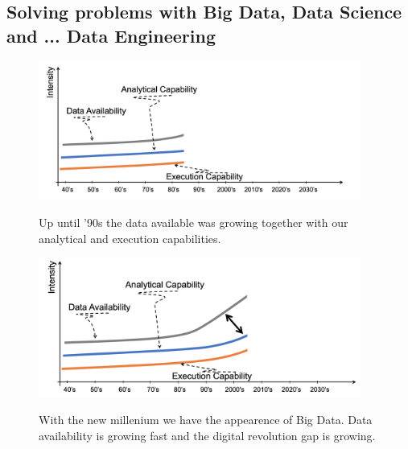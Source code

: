 \documentclass[10pt,a4paper]{article}
\begin{document}
\subsection{Solving problems with Big Data, Data Science and ... Data Engineering}
\begin{figure}[h!]
 \hfill \includegraphics[width=300pt]{images/data-analysis.png}\hspace*{\fill}
  \label{fig:data-analysis}
  \caption{Up until '90s the data available was growing together with our analytical and execution capabilities.}
\end{figure}
\begin{figure}[h!]
 \hfill \includegraphics[width=300pt]{images/big-data.png}\hspace*{\fill}
  \label{fig:big-data}
  \caption{With the new millenium we have the appearence of Big Data. Data availability is growing fast and the digital revolution gap is growing.}
\end{figure}
\end{document}
